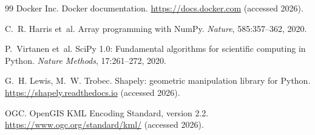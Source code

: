 \documentclass[sigconf,review,10pt]{acmart}
\begin{document}
\begin{thebibliography}{99}
Docker Inc.
\newblock Docker documentation.
\newblock \url{https://docs.docker.com} (accessed 2026).

C.~R. Harris et~al.
\newblock Array programming with NumPy.
\newblock \emph{Nature}, 585:357--362, 2020.

P.~Virtanen et~al.
\newblock SciPy 1.0: Fundamental algorithms for scientific computing in
  Python.
\newblock \emph{Nature Methods}, 17:261--272, 2020.

G.~H. Lewis, M.~W. Trobec.
\newblock Shapely: geometric manipulation library for Python.
\newblock \url{https://shapely.readthedocs.io} (accessed 2026).

OGC.
\newblock OpenGIS KML Encoding Standard, version 2.2.
\newblock \url{https://www.ogc.org/standard/kml/} (accessed 2026).

\end{thebibliography}
\end{document}
